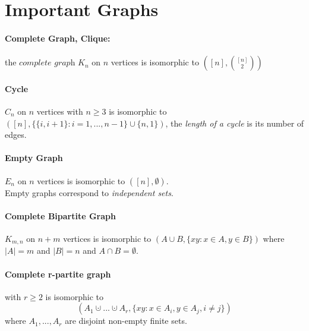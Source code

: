 \section{Important Graphs}

\paragraph{Complete Graph, Clique:} $ $ \\ 
the $ \textit{complete graph } K_n $ on $ n $ vertices is isomorphic to
$ ([n], \binom{[n]}{2}) $ 

\paragraph{Cycle} $ $ \\
$C_n $ on $ n $ vertices with $ n \geq 3 $ is isomorphic to 
$ ([n], \{\{i,i+1\}: i = 1,...,n-1\} \cup \{n,1\}) $, the \textit{length of a cycle} 
is its number of edges.

\paragraph{Empty Graph} $ $ \\
$ E_n $ on $ n $ vertices is isomorphic to $ ([n],\emptyset) $. \\
Empty graphs correspond to \textit{independent sets}.

\paragraph{Complete Bipartite Graph} $ $ \\
$ K_{m,n} $ on $ n+m $ vertices is isomorphic to 
$ (A \cup B, \{xy: x \in A, y \in B \}) $ where $ |A| = m $ and $ |B| = n $ and
$ A \cap B = \emptyset $.

\paragraph{Complete r-partite graph}
with $ r \geq 2 $ is isomorphic to
$$ (A_1 \cupdot...\cupdot A_r, \{xy: x \in A_i, y \in A_j, i \neq j\}) $$ 
where $ A_1,...,A_r $ are disjoint non-empty finite sets.